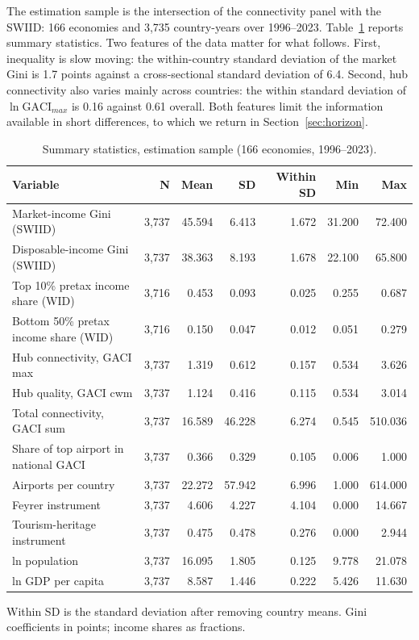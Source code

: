 The estimation sample is the intersection of the connectivity panel with the SWIID: 166 economies and 3,735 country-years over 1996--2023. Table~\ref{tab:sumstat} reports summary statistics. Two features of the data matter for what follows. First, inequality is slow moving: the within-country standard deviation of the market Gini is 1.7 points against a cross-sectional standard deviation of 6.4. Second, hub connectivity also varies mainly across countries: the within standard deviation of $\ln\mathrm{GACI}_{max}$ is 0.16 against 0.61 overall. Both features limit the information available in short differences, to which we return in Section~\ref{sec:horizon}.

\begin{table}[H]\centering\caption{Summary statistics, estimation sample (166 economies, 1996--2023).}\label{tab:sumstat}
\begin{threeparttable}\small\begin{tabular}{lrrrrrr}
\toprule
Variable & N & Mean & SD & Within SD & Min & Max \\
\midrule
Market-income Gini (SWIID) & 3,737 & 45.594 & 6.413 & 1.672 & 31.200 & 72.400 \\
Disposable-income Gini (SWIID) & 3,737 & 38.363 & 8.193 & 1.678 & 22.100 & 65.800 \\
Top 10\% pretax income share (WID) & 3,716 & 0.453 & 0.093 & 0.025 & 0.255 & 0.687 \\
Bottom 50\% pretax income share (WID) & 3,716 & 0.150 & 0.047 & 0.012 & 0.051 & 0.279 \\
Hub connectivity, GACI max & 3,737 & 1.319 & 0.612 & 0.157 & 0.534 & 3.626 \\
Hub quality, GACI cwm & 3,737 & 1.124 & 0.416 & 0.115 & 0.534 & 3.014 \\
Total connectivity, GACI sum & 3,737 & 16.589 & 46.228 & 6.274 & 0.545 & 510.036 \\
Share of top airport in national GACI & 3,737 & 0.366 & 0.329 & 0.105 & 0.006 & 1.000 \\
Airports per country & 3,737 & 22.272 & 57.942 & 6.996 & 1.000 & 614.000 \\
Feyrer instrument & 3,737 & 4.606 & 4.227 & 4.104 & 0.000 & 14.667 \\
Tourism-heritage instrument & 3,737 & 0.475 & 0.478 & 0.276 & 0.000 & 2.944 \\
ln population & 3,737 & 16.095 & 1.805 & 0.125 & 9.778 & 21.078 \\
ln GDP per capita & 3,737 & 8.587 & 1.446 & 0.222 & 5.426 & 11.630 \\
\bottomrule
\end{tabular}
\begin{tablenotes}\footnotesize\item Within SD is the standard deviation after removing country means. Gini coefficients in points; income shares as fractions.\end{tablenotes}\end{threeparttable}\end{table}

